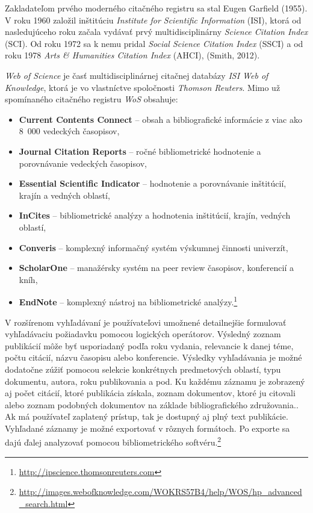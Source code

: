 Zakladateľom prvého moderného citačného registru sa stal Eugen Garfield (1955).
V roku 1960 založil inštitúciu \emph{Institute for Scientific Information}
(ISI), ktorá od nasledujúceho roku začala vydávať prvý multidisciplinárny
 \emph{Science Citation Index} (SCI). Od roku
1972 sa k nemu pridal  \emph{Social Science
  Citation Index} (SSCI) a od roku 1978  \emph{Arts \& Humanities Citation Index} (AHCI), (Smith, 2012).

\emph{Web of Science} je časť multidisciplinárnej citačnej databázy \emph{ISI
  Web of Knowledge}, ktorá je vo vlastníctve spoločnosti \emph{Thomson
  Reuters}. Mimo už spomínaného citačného registru \emph{WoS} obsahuje:

\begin{itemize}

\item \textbf{Current Contents Connect} -- obsah a bibliografické informácie z
  viac ako 8~000 vedeckých časopisov,

\item \textbf{Journal Citation Reports} -- ročné bibliometrické hodnotenie a
  porovnávanie vedeckých časopisov,

\item \textbf{Essential Scientific Indicator} -- hodnotenie a porovnávanie
  inštitúcií, krajín a vedných oblastí,

\item \textbf{InCites} -- bibliometrické analýzy a hodnotenia inštitúcií,
  krajín, vedných oblastí,

\item \textbf{Converis} -- komplexný informačný systém výskumnej činnosti
  univerzít,

\item \textbf{ScholarOne} -- manažérsky systém na peer review časopisov,
  konferencií a kníh,

\item \textbf{EndNote} – komplexný nástroj na bibliometrické
  analýzy.\footnote{\url{http://ipscience.thomsonreuters.com}}

\end{itemize}

V rozšírenom vyhľadávaní je používateľovi umožnené detailnejšie formulovať
vyhľadávaciu požiadavku pomocou logických operátorov. Výsledný zoznam publikácií
môže byť usporiadaný podľa roku vydania, relevancie k danej téme, počtu citácií,
názvu časopisu alebo konferencie. Výsledky vyhľadávania je možné dodatočne zúžiť
pomocou selekcie konkrétnych predmetových oblastí, typu dokumentu, autora, roku
publikovania a pod. Ku každému záznamu je zobrazený aj počet citácií, ktoré
publikácia získala, zoznam dokumentov, ktoré ju citovali alebo zoznam podobných
dokumentov na základe bibliografického združovania.. Ak má používateľ zaplatený
prístup, tak je dostupný aj plný text publikácie. Vyhľadané záznamy je možné
exportovať v rôznych formátoch. Po exporte sa dajú ďalej analyzovať pomocou
bibliometrického
softvéru.\footnote{\url{http://images.webofknowledge.com/WOKRS57B4/help/WOS/hp_advanced_search.html}}

